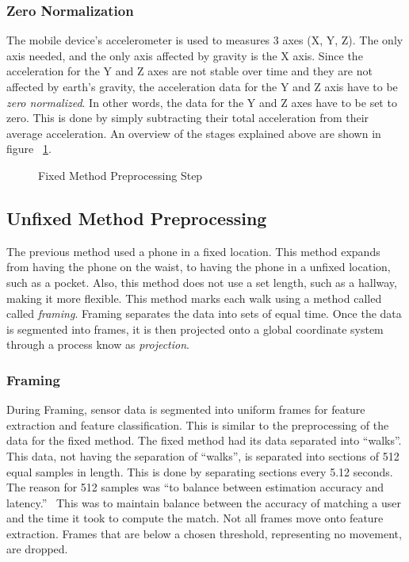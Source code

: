 \documentclass{sig-alternate}
\begin{document}
\subsubsection{Zero Normalization}
	The mobile device's accelerometer is used to measures 3 axes (X, Y, Z). The only axis needed, and the only axis affected by gravity is the X axis. Since the acceleration for the Y and Z axes are not stable over time and they are not affected by earth's gravity, the acceleration data for the Y and Z axis have to be \textit{zero normalized}. In other words, the data for the Y and Z axes have to be set to zero. This is done by simply subtracting their total acceleration from their average acceleration. An overview of the stages explained above are shown in figure ~\ref{fig:firstStep}.
	
\begin{figure}
\centering
{}
\caption{Fixed Method Preprocessing Step}
\label{fig:firstStep}
\end{figure}

	
\subsection{Unfixed Method Preprocessing}{
	The previous method used a phone in a fixed location. This method expands from having the phone on the waist, to having the phone in a unfixed location, such as a pocket. Also, this method does not use a set length, such as a hallway, making it more flexible. This method marks each walk using a method called called \textit{framing}. Framing separates the data into sets of equal time. Once the data is segmented into frames, it is then projected onto a global coordinate system through a process know as \textit{projection}.}
		
		
			
\subsubsection{Framing}{
 During Framing, sensor data is segmented into uniform frames for feature extraction and feature classification. This is similar to the preprocessing of the data for the fixed method. The fixed method had its data separated into ``walks''. This data, not having the separation of ``walks'', is separated into sections of 512 equal samples in length. This is done by separating sections every 5.12 seconds. The reason for 512 samples was ``to balance between estimation accuracy and latency.''~\cite{Lu:2014} This was to maintain balance between the accuracy of matching a user and the time it took to compute the match. Not all frames move onto feature extraction. Frames that are below a chosen threshold, representing no movement, are dropped. }
 			
\end{document}

